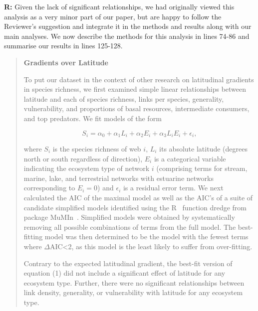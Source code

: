 \documentclass[12pt]{letter}
\begin{document}
  \textbf{R:} Given the lack of significant relationships,
  we had originally viewed this analysis as a very minor 
  part of our paper, but are happy to follow the Reviewer's 
  suggestion and integrate it in the methods and
  results along with our main analyses. We now describe 
  the methods for this analysis in lines 74-86 and 
  summarise our results in lines 125-128.


  \begin{quotation}

    \textbf{Gradients over Latitude}

    To put our dataset in the context of other research on latitudinal gradients in species richness,
    we first examined simple linear relationships between latitude and each of 
    species richness, links per species, generality, vulnerability, and proportions
    of basal resources, intermediate consumers, and top predators. We fit models of the form

    \begin{equation}
    \label{Latfull}
    S_{i} = \alpha_{0} + \alpha_{1} L_{i} + \alpha_{2} E_{i} + \alpha_{3} L_{i} E_{i} + \epsilon_{i} ,
    \end{equation}

    \noindent where $S_{i}$ is the species richness of web $i$, $L_{i}$ its absolute
    latitude (degrees north or south  regardless of direction), $E_{i}$ is a categorical
    variable indicating the ecosystem type of network $i$ (comprising terms for stream, 
    marine, lake, and terrestrial networks with estuarine
    networks corresponding to $E_{i}=0$) and $\epsilon_{i}$ is a residual error term. 
    We next calculated the AIC
    of the maximal model as well as the AIC's of a suite of candidate simplified models identified
    using the R~\cite{R} function dredge from package MuMIn~\cite{MuMIn}. 
    Simplified models were obtained by
    systematically removing all possible combinations of terms from the full model.
    The best-fitting model was then determined to be the model with the fewest terms 
    where $\Delta$AIC\textless2, as this model is the least likely to suffer from over-fitting. 


    \smallskip

    Contrary to the expected latitudinal gradient, the 
    best-fit version of equation (1) did not include a 
    significant effect of latitude for any ecosystem type. 
    Further, there were no significant relationships 
    between link density, generality, or vulnerability with
    latitude for any ecosystem type.

  \end{quotation}
\end{document}
